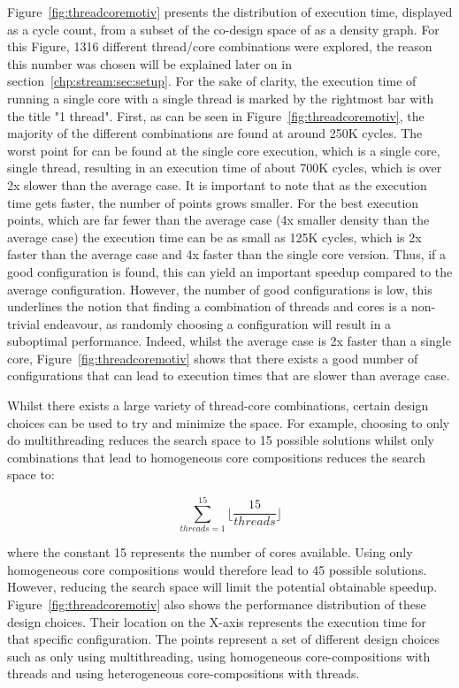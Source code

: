 Figure~\ref{fig:threadcoremotiv} presents the distribution of execution time, displayed as a cycle count, from a subset of the co-design space of  as a density graph.
For this Figure, 1316 different thread/core combinations were explored, the reason this number was chosen will be explained later on in section~\ref{chp:stream:sec:setup}.
For the sake of clarity, the execution time of running a single core with a single thread is marked by the rightmost bar with the title "1 thread".
First, as can be seen in Figure~\ref{fig:threadcoremotiv}, the majority of the different combinations are found at around 250K cycles.
The worst point for  can be found at the single core execution, which is a single core, single thread, resulting in an execution time of about 700K cycles, which is over 2x slower than the average case.
It is important to note that as the execution time gets faster, the number of points grows smaller.
For the best execution points, which are far fewer than the average case (4x smaller density than the average case) the execution time can be as small as 125K cycles, which is 2x faster than the average case and 4x faster than the single core version.
Thus, if a good configuration is found, this can yield an important speedup compared to the average configuration.
However, the number of good configurations is low, this underlines the notion that finding a combination of threads and cores is a non-trivial endeavour, as randomly choosing a configuration will result in a suboptimal performance.
Indeed, whilst the average case is 2x faster than a single core, Figure~\ref{fig:threadcoremotiv} shows that there exists a good number of configurations that can lead to execution times that are slower than average case.

Whilst there exists a large variety of thread-core combinations, certain design choices can be used to try and minimize the space.
For example, choosing to only do multithreading reduces the search space to 15 possible solutions whilst only combinations that lead to homogeneous core compositions reduces the search space to:

\begin{equation}
\sum_{threads=1}^{15} \lfloor\frac{15}{threads}\rfloor
\end{equation}

where the constant 15 represents the number of cores available.
Using only homogeneous core compositions would therefore lead to 45 possible solutions.
However, reducing the search space will limit the potential obtainable speedup.
Figure~\ref{fig:threadcoremotiv} also shows the performance distribution of these design choices.
Their location on the X-axis represents the execution time for that specific configuration.
The points represent a set of different design choices such as only using multithreading, using homogeneous core-compositions with threads and using heterogeneous core-compositions with threads.

